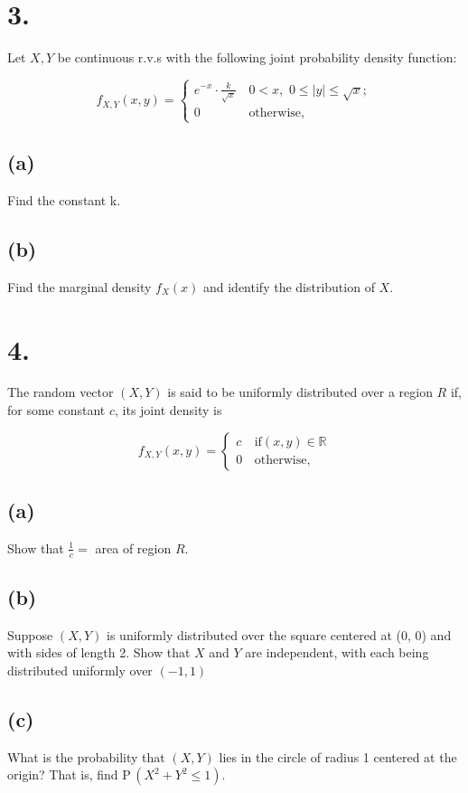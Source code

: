 \documentclass{article}
\begin{document}
\section*{3.}
{\Large 

Let  $X, Y$ be continuous r.v.s with the following joint probability density function:

\[
f_{X,Y}\left(x,y\right)=\begin{cases}
e^{-x}\cdot\frac{k}{\sqrt{x}}& \,0< x,\,\, 0\le|y| \le \sqrt{x};\\
0 & \,\mbox{otherwise,}
\end{cases}
\]

\subsection*{(a)}
Find the constant k.


\subsection*{(b)}
Find the marginal density $f_X (x)$ and identify the distribution of $X$.


}

\section*{4.}
{\Large 
The random vector $(X, Y)$ is said to be uniformly distributed over a region $R$ if, for some
constant $c$, its joint density is

\[
f_{X,Y}\left(x,y\right)=\begin{cases}
c& \,\mbox{if} \left(x,y\right)\in\mathbb R\\
0 & \,\mbox{otherwise,}
\end{cases}
\]

\subsection*{(a)}
Show that $\frac{1}{c}=$  area of region $R$.


\subsection*{(b)}
Suppose $(X, Y)$  is uniformly distributed over the square centered at (0, 0) and with sides
of length 2. Show that $X$ and $Y$ are independent, with each being distributed uniformly
over $(-1,1)$


\subsection*{(c)}
What is the probability that $(X, Y)$ lies in the circle of radius 1 centered at the origin?
That is, find $\mathrm P \,(X^2 + Y^ 2 \le 1)$.


}
\end{document}
